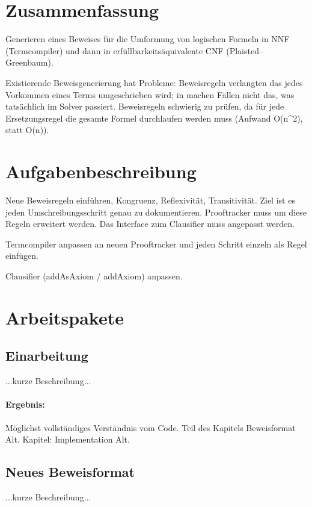 \documentclass[a4paper]{article}
\title{}
\author{Markus Pomrehn}
\begin{document}
\section{Zusammenfassung}

Generieren eines Beweises für die Umformung von logischen Formeln in
NNF (Termcompiler) und dann in erfüllbarkeitsäquivalente CNF
(Plaisted--Greenbaum).

Existierende Beweisgenerierung hat Probleme: Beweisregeln verlangten
das jedes Vorkommen eines Terms umgeschrieben wird; in machen Fällen
nicht das, was tatsächlich im Solver passiert.  Beweisregeln schwierig
zu prüfen, da für jede Ersetzungsregel die gesamte Formel durchlaufen
werden muss (Aufwand O(n^2), statt O(n)).

\section{Aufgabenbeschreibung}

Neue Beweisregeln einführen, Kongruenz, Reflexivität, Transitivität.
Ziel ist es jeden Umschreibungsschritt genau zu dokumentieren.
Prooftracker muss um diese Regeln erweitert werden.  Das Interface zum
Clausifier muss angepasst werden.

Termcompiler anpassen an neuen Prooftracker und jeden Schritt einzeln
als Regel einfügen.

Clausifier (addAsAxiom / addAxiom) anpassen.

\section{Arbeitspakete}

\subsection{Einarbeitung}

...kurze Beschreibung...

\paragraph{Ergebnis:}
Möglichst vollständiges Verständnis vom Code.
Teil des Kapitels Beweisformat Alt.
Kapitel: Implementation Alt.

\subsection{Neues Beweisformat}

...kurze Beschreibung...
\end{document}
